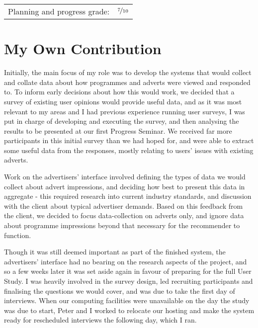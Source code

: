 \hfill \begin{tabular}{l l}
	Planning and progress grade: & $\nicefrac{7}{10}$ \\
\end{tabular}

\section*{My Own Contribution}

Initially, the main focus of my role was to develop the systems that would collect and collate data about how programmes and adverts were viewed and responded to. To inform early decisions about how this would work, we decided that a survey of existing user opinions would provide useful data, and as it was most relevant to my areas and I had previous experience running user surveys, I was put in charge of developing and executing the survey, and then analysing the results to be presented at our first Progress Seminar. We received far more participants in this initial survey than we had hoped for, and were able to extract some useful data from the responses, mostly relating to users' issues with existing adverts.

Work on the advertisers' interface involved defining the types of data we would collect about advert impressions, and deciding how best to present this data in aggregate - this required research into current industry standards, and discussion with the client about typical advertiser demands. Based on this feedback from the client, we decided to focus data-collection on adverts only, and ignore data about programme impressions beyond that necessary for the recommender to function.

Though it was still deemed important as part of the finished system, the advertisers' interface had no bearing on the research aspects of the project, and so a few weeks later it was set aside again in favour of preparing for the full User Study. I was heavily involved in the survey design, led recruiting participants and finalising the questions we would cover, and was due to take the first day of interviews. When our computing facilities were unavailable on the day the study was due to start, Peter and I worked to relocate our hosting and make the system ready for rescheduled interviews the following day, which I ran.

